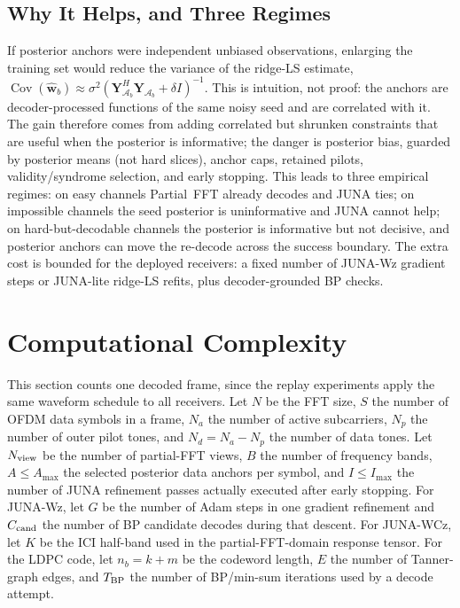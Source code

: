 \documentclass[journal]{IEEEtran}
\newcommand{\Ht}{^{H}}
\newcommand{\juna}{JUNA}
\newcommand{\junalite}{JUNA-lite}
\newcommand{\junawz}{JUNA-Wz}
\newcommand{\junawcz}{JUNA-WCz}
\begin{document}
\subsection{Why It Helps, and Three Regimes}
If posterior anchors were independent unbiased observations, enlarging the
training set would reduce the variance of the ridge-LS estimate,
$\operatorname{Cov}(\widehat{\mathbf w}_b)\approx\sigma^2(\mathbf
Y_{\mathcal A_b}\Ht\mathbf Y_{\mathcal A_b}+\delta I)^{-1}$. This is intuition,
not proof: the anchors are decoder-processed functions of the same noisy seed and
are correlated with it. The gain therefore comes from adding correlated but
shrunken constraints that are useful when the posterior is informative; the
danger is posterior bias, guarded by posterior means (not hard slices),
anchor caps, retained pilots, validity/syndrome selection, and
early stopping. This leads to three empirical regimes: on easy channels Partial~FFT
already decodes and \juna{} ties; on impossible channels the seed posterior is
uninformative and \juna{} cannot help; on hard-but-decodable channels the
posterior is informative but not decisive, and posterior anchors can move the
re-decode across the success boundary. The extra cost is bounded for the
deployed receivers: a fixed number of \junawz{} gradient steps or \junalite{}
ridge-LS refits, plus decoder-grounded BP checks.

\section{Computational Complexity}\label{sec:complexity}
This section counts one decoded frame, since the replay experiments apply the
same waveform schedule to all receivers. Let $N$ be the FFT size, $S$ the number
of OFDM data symbols in a frame, $N_a$ the number of active subcarriers, $N_p$
the number of outer pilot tones, and $N_d=N_a-N_p$ the number of data tones. Let
$N_{\rm view}$ be the number of partial-FFT views, $B$ the number of frequency
bands, $A\le A_{\max}$ the selected posterior data anchors per symbol, and
$I\le I_{\max}$ the number of \juna{} refinement passes actually executed after
early stopping. For \junawz{}, let $G$ be the number of Adam steps in one
gradient refinement and $C_{\rm cand}$ the number of BP candidate decodes during
that descent. For \junawcz{}, let $K$ be the ICI half-band used in
the partial-FFT-domain response tensor. For the LDPC code, let $n_b=k+m$ be the codeword length, $E$ the
number of Tanner-graph edges, and $T_{\rm BP}$ the number of BP/min-sum
iterations used by a decode attempt.
\end{document}
